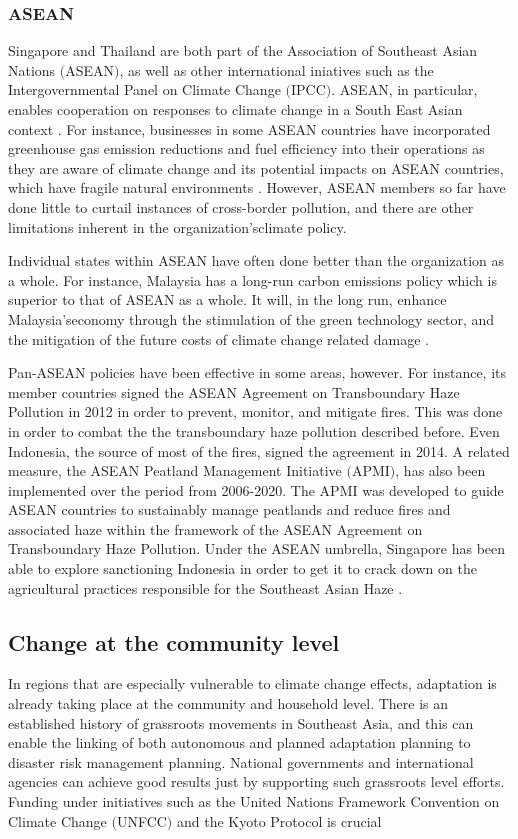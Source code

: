\subsubsection{ASEAN}
Singapore and Thailand are both part of the Association of Southeast Asian Nations $($ASEAN$)$, as well as other international iniatives such as the Intergovernmental Panel on Climate Change $($IPCC$)$. ASEAN, in particular, enables cooperation on responses to climate change in a South East Asian context \citep{asean2015}. For instance, businesses in some ASEAN countries have incorporated greenhouse gas emission reductions and fuel efficiency into their operations as they are aware of climate change and its potential impacts on ASEAN countries, which have fragile natural environments \citep{aseanbusiness}. However, ASEAN members so far have done little to curtail instances of cross-border pollution, and there are other limitations inherent in the organization'sclimate policy. 

Individual states within ASEAN have often done better than the organization as a whole. For instance, Malaysia has a long-run carbon emissions policy which is superior to that of ASEAN as a whole. It will, in the long run, enhance Malaysia'seconomy through the stimulation of the green technology sector, and the mitigation of the future costs of climate change related damage \citep{aseanmalaysia}. 

Pan-ASEAN policies have been effective in some areas, however. For instance, its member
countries signed the ASEAN Agreement on Transboundary Haze Pollution in 2012 in
order to prevent, monitor, and mitigate fires. This was done in order to combat the the transboundary haze pollution described before. Even Indonesia, the source of most of the fires, signed the agreement in 2014. A related measure, the ASEAN Peatland Management Initiative $($APMI$)$, has also been implemented over the period from 2006-2020. The APMI was  developed to guide ASEAN countries to sustainably manage peatlands and reduce fires and associated haze within the framework of the ASEAN Agreement on Transboundary Haze Pollution. Under the ASEAN umbrella, Singapore has been able to explore sanctioning Indonesia in order to get it to crack down on the agricultural practices responsible for the Southeast Asian Haze \citep{singahongkong}.  

\subsection{Change at the community level}
In regions that are especially vulnerable to climate change effects, adaptation is already taking place at the community and household level. There is an established history of grassroots movements in Southeast Asia, and this can enable the linking of both autonomous and planned adaptation planning to disaster risk management planning. National governments and international agencies can achieve good results just by supporting such grassroots level efforts. Funding under initiatives such as the United Nations Framework Convention on Climate Change $($UNFCC$)$ and the Kyoto Protocol is crucial \citep{adaptationseasia}

